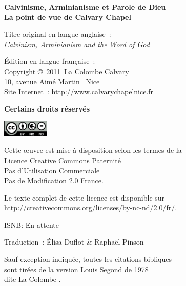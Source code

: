 \newpage
\mbox{}
\vfill

{\scriptsize

{\bfseries Calvinisme, Arminianisme et Parole de Dieu\\
La point de vue de Calvary Chapel}

Titre original en langue anglaise~:\\
\emph{Calvinism, Arminianism and the Word of God}

Édition en langue française~:\\
Copyright \copyright{}~2011~La Colombe Calvary\\
 10, avenue Aimé Martin ~Nice\\
Site Internet~: \url{http://www.calvarychapelnice.fr}

{\bfseries Certains droits réservés}

\includegraphics[width=6em]{by-nc-nd_eu}

Cette \oe{}uvre est mise à disposition selon les termes de la \\
 Licence Creative Commons Paternité \\
 \ocadr Pas d'Utilisation Commerciale \\
 \ocadr Pas de Modification 2.0 France.

Le texte complet de cette licence est disponible sur \\
 \url{http://creativecommons.org/licenses/by-nc-nd/2.0/fr/}.

ISNB: En attente

Traduction~: Élisa Duflot \& Raphaël Pinson

Sauf exception indiquée, toutes les citations bibliques \\
 sont tirées de la version Louis Segond de 1978 \\ dite \og La Colombe \fg{}.

}
\enlargethispage{\footskip}

